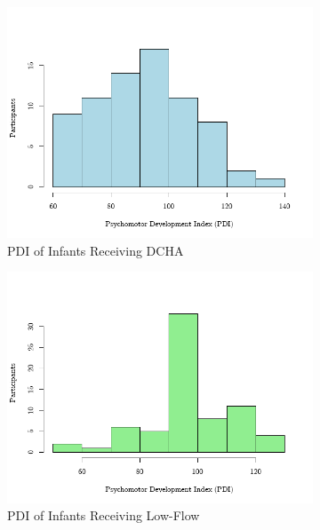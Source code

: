 \documentclass{article}
\begin{document}
\begin{enumerate}
		
		\begin{figure}[h!]
			\centering
			\begin{subfigure}[b]{0.23\textwidth}  %
				\centering
				\includegraphics[width=\textwidth]{CS2_DCHA_PDI.png}
				\caption{PDI of Infants Receiving DCHA}
			\end{subfigure}
			\hfill
			\begin{subfigure}[b]{0.23\textwidth}  %
				\centering
				\includegraphics[width=\textwidth]{CS2_LF_PDI.png}
				\caption{PDI of Infants Receiving Low-Flow}
			\end{subfigure}
			\hfill
			\begin{subfigure}[b]{0.23\textwidth}  %

\end{subfigure}
\end{figure}
\end{enumerate}
\end{document}
